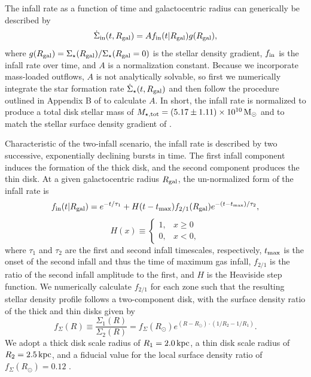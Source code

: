 \documentclass[twocolumn,twocolappendix,linenumbers]{aastex631}
\newcommand{\kpc}{\,{\rm kpc}}
\begin{document}
The infall rate as a function of time and galactocentric radius can generically be described by
\begin{equation}
    \label{eq:infall-rate}
    \dot\Sigma_{\rm in}(t,R_{\rm gal}) = A f_{\rm in}(t|R_{\rm gal}) g(R_{\rm gal}),
\end{equation}
where $g(R_{\rm gal})=\Sigma_\star(R_{\rm gal}) / \Sigma_\star(R_{\rm gal}=0)$ is the stellar density gradient, $f_{\rm in}$ is the infall rate over time, and $A$ is a normalization constant. Because we incorporate mass-loaded outflows, $A$ is not analytically solvable, so first we numerically integrate the star formation rate $\dot\Sigma_\star(t,R_{\rm gal})$ and then follow the procedure outlined in Appendix B of \citet{johnson_stellar_2021} to calculate $A$. In short, the infall rate is normalized to produce a total disk stellar mass of $M_{\rm \star,tot}=(5.17\pm1.11)\times 10^{10}\,{\rm M}_\odot$ \citep{licquia_improved_2015} and to match the stellar surface density gradient of \citet{bland-hawthorn_galaxy_2016}.

Characteristic of the two-infall scenario, the infall rate is described by two successive, exponentially declining bursts in time. The first infall component induces the formation of the thick disk, and the second component produces the thin disk. At a given galactocentric radius $R_{\rm gal}$, the un-normalized form of the infall rate is
\begin{equation}
    \label{eq:twoinfall-ifr}
    f_{\rm in}(t|R_{\rm gal}) = e^{-t/\tau_1} + H(t-t_{\rm max}) f_{2/1} (R_{\rm gal}) e^{-(t-t_{\rm max})/\tau_2},
\end{equation}
\begin{equation*}
    H(x) \equiv 
    \begin{cases}
        1, & x \ge 0 \\
        0, & x < 0,
    \end{cases}
\end{equation*}
where $\tau_1$ and $\tau_2$ are the first and second infall timescales, respectively, $t_{\rm max}$ is the onset of the second infall and thus the time of maximum gas infall,  $f_{2/1}$ is the ratio of the second infall amplitude to the first, and $H$ is the Heaviside step function. We numerically calculate $f_{2/1}$ for each zone such that the resulting stellar density profile follows a two-component disk, with the surface density ratio of the thick and thin disks given by
\begin{equation}
    f_\Sigma(R) \equiv \frac{\Sigma_1(R)}{\Sigma_2(R)} = f_\Sigma(R_\odot) e^{(R-R_\odot)\cdot(1/R_2 - 1/R_1)}.
\end{equation}
We adopt a thick disk scale radius of $R_1=2.0\kpc$, a thin disk scale radius of $R_2=2.5\kpc$, and a fiducial value for the local surface density ratio of $f_\Sigma(R_\odot)=0.12$ \citep{bland-hawthorn_galaxy_2016}. 
\end{document}
